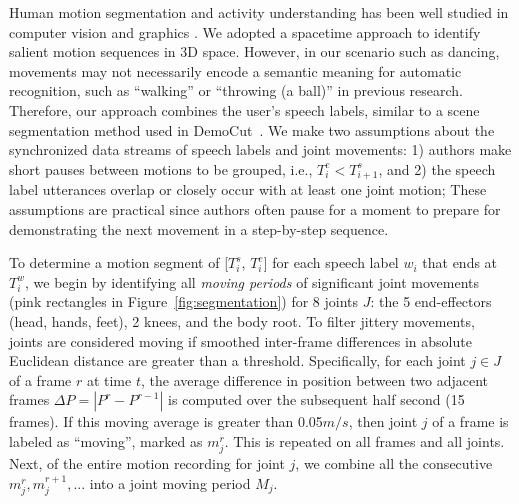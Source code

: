Human motion segmentation and activity understanding has been well studied in computer vision and graphics \cite{Aggarwal:2011:HAA:1922649.1922653}. We adopted a spacetime approach to identify salient motion sequences in 3D space.
%
However, in our scenario such as dancing, movements may not necessarily encode a semantic meaning for automatic recognition, such as ``walking'' or ``throwing (a ball)'' in previous research. Therefore, our approach combines the user's speech labels, similar to a scene segmentation method used in DemoCut~\cite{Chi:2013:DGC:2501988.2502052}.
%
We make two assumptions about the synchronized data streams of speech labels and joint movements:
1) authors make short pauses between motions to be grouped, i.e., $T_i^e < T_{i+1}^s$, and
2) the speech label utterances overlap or closely occur with at least one joint motion;
%
These assumptions are practical since authors often pause for a moment to prepare for demonstrating the next movement in a step-by-step sequence.



To determine a motion segment of [$T_i^s$, $T_i^e$] for each speech label $w_i$ that ends at $T_i^w$, we begin by identifying all \emph{moving periods} of significant joint movements (pink rectangles in Figure~\ref{fig:segmentation}) for 8 joints $J$: the 5 end-effectors (head, hands, feet), 2 knees, and the body root.
%
To filter jittery movements, joints are considered moving if smoothed inter-frame differences in absolute Euclidean distance are greater than a threshold.
%
Specifically, for each joint $j \in J$ of a frame $r$ at time $t$, the average difference in position between two adjacent frames $\Delta P = |P^r-P^{r-1}|$ is computed over the subsequent half second (15 frames).
%
If this moving average is greater than 0.05$m/s$, then joint $j$ of a frame is labeled as ``moving'', marked as $m_j^r$.
This is repeated on all frames and all joints.
Next, of the entire motion recording for joint $j$, we combine all the consecutive $m_j^r, m_j^{r+1}, ...$ into a joint moving period $M_j$.

